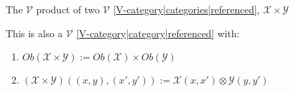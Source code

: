 
The $\mathcal{V}$ product of two $\mathcal{V}$ \ref{V-category|categories|referenced}, $\mathcal{X} \times \mathcal{Y}$

This is also a $\mathcal{V}$ \ref{V-category|category|referenced} with:
\begin{enumerate}
  \item $Ob(\mathcal{X}\times\mathcal{Y}) := Ob(\mathcal{X})\times Ob(\mathcal{Y})$
  \item $(\mathcal{X} \times \mathcal{Y})((x,y),(x',y')) := \mathcal{X}(x,x') \otimes \mathcal{Y}(y,y')$
\end{enumerate}
